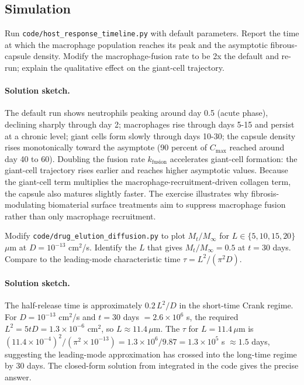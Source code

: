 \subsection*{Simulation}

\begin{exercise}
Run \texttt{code/host\_response\_timeline.py} with default
parameters. Report the time at which the macrophage population
reaches its peak and the asymptotic fibrous-capsule density.
Modify the macrophage-fusion rate to be 2x the default and
re-run; explain the qualitative effect on the giant-cell trajectory.
\end{exercise}

\paragraph{Solution sketch.}
The default run shows neutrophils peaking around day 0.5 (acute
phase), declining sharply through day 2; macrophages rise through
days 5-15 and persist at a chronic level; giant cells form
slowly through days 10-30; the capsule density rises monotonically
toward the asymptote (90 percent of $C_{\max}$ reached around day
40 to 60). Doubling the fusion rate $k_{\text{fusion}}$ accelerates
giant-cell formation: the giant-cell trajectory rises earlier and
reaches higher asymptotic values. Because the giant-cell term
multiplies the macrophage-recruitment-driven collagen term, the
capsule also matures slightly faster. The exercise illustrates
why fibrosis-modulating biomaterial surface treatments aim to
suppress macrophage fusion rather than only macrophage recruitment.

\begin{exercise}
Modify \texttt{code/drug\_elution\_diffusion.py} to plot
$M_t/M_\infty$ for $L \in \{5, 10, 15, 20\}$ $\mu$m at $D = 10^{-13}$
cm$^2$/s. Identify the $L$ that gives $M_t/M_\infty = 0.5$ at $t =
30$ days. Compare to the leading-mode characteristic time $\tau
= L^2/(\pi^2 D)$.
\end{exercise}

\paragraph{Solution sketch.}
The half-release time is approximately $0.2 \, L^2 / D$ in the
short-time Crank regime. For $D = 10^{-13}$ cm$^2$/s and $t = 30
$ days $= 2.6 \times 10^6$ s, the required $L^2 = 5 t D = 1.3
\times 10^{-6}$ cm$^2$, so $L \approx 11.4 \,\mu\text{m}$. The
$\tau$ for $L = 11.4 \,\mu\text{m}$ is $(11.4 \times 10^{-4})^2 /
(\pi^2 \times 10^{-13}) = 1.3 \times 10^{6}/9.87 = 1.3 \times 10^5
$ s $\approx 1.5$ days, suggesting the leading-mode approximation
has crossed into the long-time regime by 30 days. The closed-form
solution from
\cite{paper:v6c12-crank-diffusion-1975} integrated in the code
gives the precise answer.

